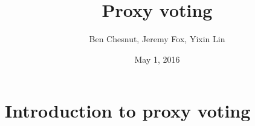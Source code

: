 \documentclass[a4paper,10pt]{article}
\title{
Proxy voting\\
}
\author{Ben Chesnut, Jeremy Fox, Yixin Lin}
\date{May 1, 2016}
\begin{document}
\maketitle

\section{Introduction to proxy voting}
\end{document}
